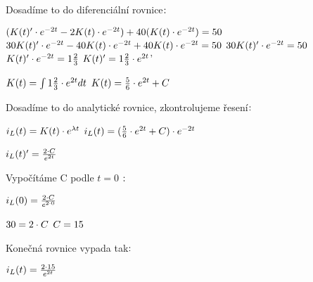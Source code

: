 Dosadíme to do diferenciální rovnice$:\\$

$(K(t)'\cdot e^{-2 t} - 2K(t) \cdot e^{-2 t}) + 40(K(t)\cdot e^{-2 t}) = 50 \\$
$30K(t)'\cdot e^{-2 t} - 40K(t)\cdot e^{-2 t} + 40K(t)\cdot e^{-2 t} = 50 \\$
$30K(t)'\cdot e^{-2 t} = 50 \\$
$K(t)'\cdot e^{-2 t} = 1 \frac{2}{3} \\$
$K(t)' = 1 \frac{2}{3}\cdot e^{2 t}\\$'

$K(t) = \int 1 \frac{2}{3}\cdot e^{2 t} dt \\$
$K(t) = \frac{5}{6}\cdot e^{2 t} + C\\$

Dosadíme to do analytické rovnice, zkontrolujeme řesení$:\\$

$i_L(t) = K(t) \cdot e^{\lambda t} \\$
$i_L(t) = (\frac{5}{6}\cdot e^{2 t} + C) \cdot e^{-2 t} \\$

$i_L(t)' = \frac{2 \cdot C}{e^{2t}}\\$

Vypočítáme C podle $t = 0$ $:\\$

$i_L(0) = \frac{2 \cdot C}{e^{2\cdot 0}} \\$

$30 = {2 \cdot C}\\$
$C = 15\\$

Konečná rovnice vypada tak$:\\$

$i_L(t)  = \frac{2 \cdot 15}{e^{2t}} \\$